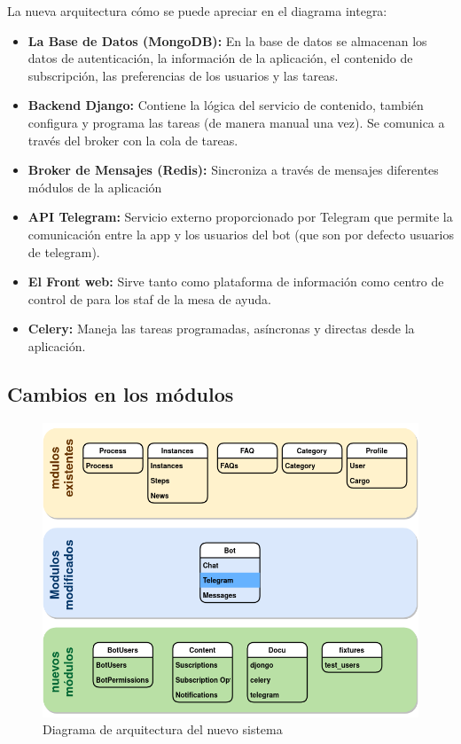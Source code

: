     \par La nueva arquitectura cómo se puede apreciar en el diagrama integra:
    \begin{itemize}
        \item \textbf{La Base de Datos (MongoDB):}  En la base de datos se almacenan los datos de autenticación, la información de la aplicación, el contenido de subscripción, las preferencias de los usuarios y las tareas.
        \item  \textbf{Backend Django:} Contiene la lógica del servicio de contenido, también configura y programa las tareas (de manera manual una vez). Se comunica a través del broker con la cola de tareas.
        \item \textbf{Broker de Mensajes (Redis):} Sincroniza a través de mensajes diferentes módulos de la aplicación
        \item  \textbf{API Telegram:} Servicio externo proporcionado por \gls{Telegram} que permite la comunicación entre la app y los usuarios del bot (que son por defecto usuarios de telegram).
        \item  \textbf{El Front web:} Sirve tanto como plataforma de información como centro de control de para los staf de la mesa de ayuda.
        \item \textbf{Celery:} Maneja las tareas programadas, asíncronas y directas desde la aplicación.
    \end{itemize}
    
    \subsection{Cambios en los módulos}

    \begin{figure}[h!]
        \centering
        \includegraphics[width=\textwidth]{media/diagramas/arquitectura/arc-logica.png}
        \caption[Nueva arquitectura]{Diagrama de arquitectura del nuevo sistema}
        
    \end{figure}
  


